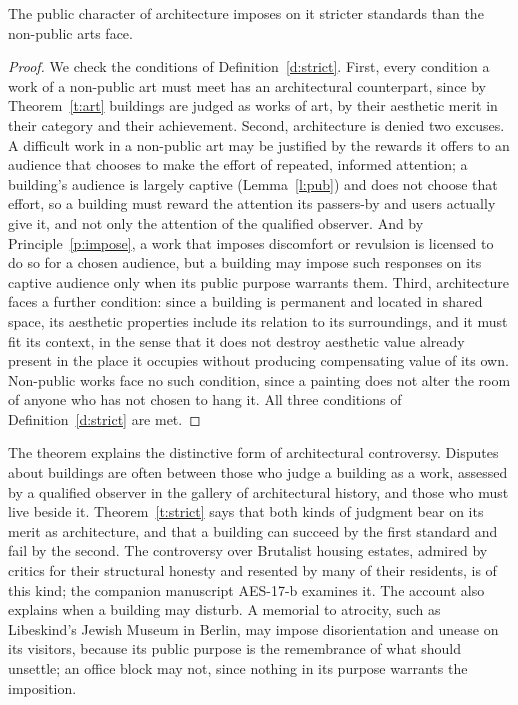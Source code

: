 \documentclass{situationist-preprint}
\begin{document}
\begin{theorem}\label{t:strict}
The public character of architecture imposes on it stricter standards than the non-public arts face.
\end{theorem}

\begin{proof}
We check the conditions of Definition~\ref{d:strict}. First, every condition a work of a non-public art must meet has an architectural counterpart, since by Theorem~\ref{t:art} buildings are judged as works of art, by their aesthetic merit in their category and their achievement. Second, architecture is denied two excuses. A difficult work in a non-public art may be justified by the rewards it offers to an audience that chooses to make the effort of repeated, informed attention; a building's audience is largely captive (Lemma~\ref{l:pub}) and does not choose that effort, so a building must reward the attention its passers-by and users actually give it, and not only the attention of the qualified observer. And by Principle~\ref{p:impose}, a work that imposes discomfort or revulsion is licensed to do so for a chosen audience, but a building may impose such responses on its captive audience only when its public purpose warrants them. Third, architecture faces a further condition: since a building is permanent and located in shared space, its aesthetic properties include its relation to its surroundings, and it must fit its context, in the sense that it does not destroy aesthetic value already present in the place it occupies without producing compensating value of its own. Non-public works face no such condition, since a painting does not alter the room of anyone who has not chosen to hang it. All three conditions of Definition~\ref{d:strict} are met.
\end{proof}

The theorem explains the distinctive form of architectural controversy. Disputes about buildings are often between those who judge a building as a work, assessed by a qualified observer in the gallery of architectural history, and those who must live beside it. Theorem~\ref{t:strict} says that both kinds of judgment bear on its merit as architecture, and that a building can succeed by the first standard and fail by the second. The controversy over Brutalist housing estates, admired by critics for their structural honesty and resented by many of their residents, is of this kind; the companion manuscript AES-17-b examines it. The account also explains when a building may disturb. A memorial to atrocity, such as Libeskind's Jewish Museum in Berlin, may impose disorientation and unease on its visitors, because its public purpose is the remembrance of what should unsettle; an office block may not, since nothing in its purpose warrants the imposition.
\end{document}
